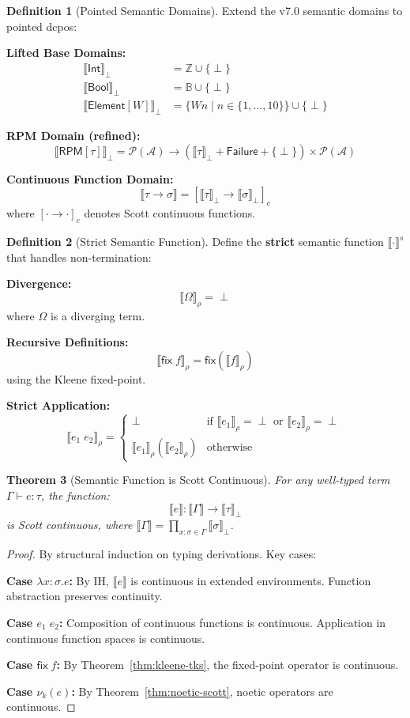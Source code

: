 \documentclass[11pt,twoside,openright]{book}
\theoremstyle{definition}
\newtheorem{definition}{Definition}[chapter]
\theoremstyle{plain}
\newtheorem{theorem}[definition]{Theorem}
\theoremstyle{remark}
\newcommand{\sem}[1]{\llbracket #1 \rrbracket}
\newcommand{\Acquisitions}{\mathcal{A}}
\newcommand{\noe}[1]{\nu_{#1}}
\newcommand{\types}{\vdash}
\newcommand{\fix}{\mathsf{fix}}            %
\newcommand{\bot}{\perp}                   %
\begin{document}
\begin{definition}[Pointed Semantic Domains]
\label{def:pointed-domains}
Extend the v7.0 semantic domains to pointed dcpos:

\textbf{Lifted Base Domains:}
\begin{align}
\sem{\mathsf{Int}}_\bot &= \mathbb{Z} \cup \{\bot\} \\
\sem{\mathsf{Bool}}_\bot &= \mathbb{B} \cup \{\bot\} \\
\sem{\mathsf{Element}[W]}_\bot &= \{Wn \mid n \in \{1,\ldots,10\}\} \cup \{\bot\}
\end{align}

\textbf{RPM Domain (refined):}
\[
\sem{\mathsf{RPM}[\tau]}_\bot = \mathcal{P}(\Acquisitions) \to (\sem{\tau}_\bot + \mathsf{Failure} + \{\bot\}) \times \mathcal{P}(\Acquisitions)
\]

\textbf{Continuous Function Domain:}
\[
\sem{\tau \to \sigma} = [\sem{\tau}_\bot \to \sem{\sigma}_\bot]_c
\]
where $[\cdot \to \cdot]_c$ denotes Scott continuous functions.
\end{definition}

\begin{definition}[Strict Semantic Function]
\label{def:strict-sem}
Define the \textbf{strict} semantic function $\sem{\cdot}^s$ that handles non-termination:

\textbf{Divergence:}
\[
\sem{\Omega}_\rho = \bot
\]
where $\Omega$ is a diverging term.

\textbf{Recursive Definitions:}
\[
\sem{\mathsf{fix}\; f}_\rho = \fix(\sem{f}_\rho)
\]
using the Kleene fixed-point.

\textbf{Strict Application:}
\[
\sem{e_1\; e_2}_\rho =
\begin{cases}
\bot & \text{if } \sem{e_1}_\rho = \bot \text{ or } \sem{e_2}_\rho = \bot \\
\sem{e_1}_\rho(\sem{e_2}_\rho) & \text{otherwise}
\end{cases}
\]
\end{definition}

\begin{theorem}[Semantic Function is Scott Continuous]
\label{thm:sem-scott}
For any well-typed term $\Gamma \types e : \tau$, the function:
\[
\sem{e} : \sem{\Gamma} \to \sem{\tau}_\bot
\]
is Scott continuous, where $\sem{\Gamma} = \prod_{x:\sigma \in \Gamma} \sem{\sigma}_\bot$.
\end{theorem}

\begin{proof}
By structural induction on typing derivations. Key cases:

\textbf{Case $\lambda x:\sigma. e$:} By IH, $\sem{e}$ is continuous in extended environments. Function abstraction preserves continuity.

\textbf{Case $e_1\; e_2$:} Composition of continuous functions is continuous. Application in continuous function spaces is continuous.

\textbf{Case $\mathsf{fix}\; f$:} By Theorem~\ref{thm:kleene-tks}, the fixed-point operator is continuous.

\textbf{Case $\noe{k}(e)$:} By Theorem~\ref{thm:noetic-scott}, noetic operators are continuous.
\end{proof}
\end{document}

